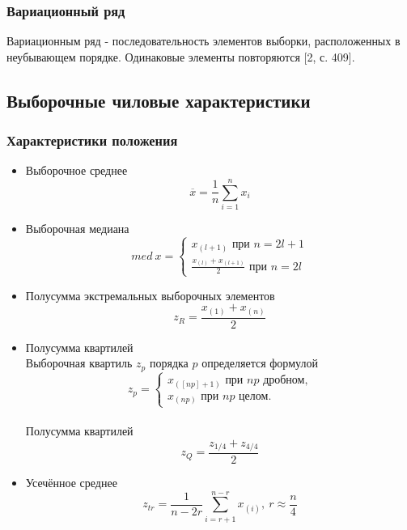 	\subsubsection {Вариационный ряд}
		Вариационным ряд - последовательность элементов выборки, расположенных в неубывающем порядке. Одинаковые элементы повторяются [2, с. 409].

\subsection {Выборочные чиловые характеристики}
	\subsubsection {Характеристики положения}
		\begin{itemize}
			\item {Выборочное среднее\\ \begin{equation}\overline{x} = \frac{1}{n}\sum_{i=1}^{n}x_i\end{equation}}

			\item {Выборочная медиана\\ \begin{equation}med\ x = 
									\begin{cases}
										x_{(l+1)} \text{ при } n = 2l + 1 \\
										\frac{x_{(l)} + x_{(l+1)}}{2} \text{ при } n=2l
									\end{cases}\end{equation}}

			\item {Полусумма экстремальных выборочных элементов \\ \begin{equation}z_R =  \frac{x_{(1)}+x_{(n)}}{2}\end{equation}}

			\item {Полусумма квартилей\\
			Выборочная квартиль $z_p$ порядка $p$ определяется формулой \\ 
			\begin{equation}z_p = \begin{cases} x_{([np]+1)} \text{ при } np \text{ дробном,} \\ x_{(np)} \text{ при } np \text{ целом.} \end{cases}\end{equation}\\
			Полусумма квартилей\\
				\begin{equation}z_Q = \frac{z_{1/4} + z_{4/4}}{2}\end{equation}}

			\item {Усечённое среднее \\ \begin{equation}z_{tr} = \frac{1}{n-2r}\sum_{i=r+1}^{n-r}x_{(i)},\ r\approx \frac{n}{4}\end{equation}}
		\end{itemize}
	
